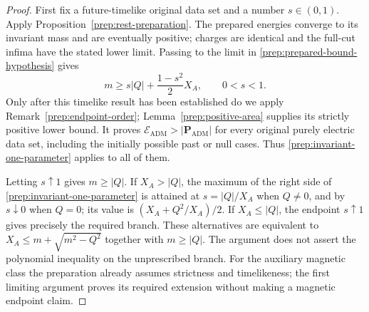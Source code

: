 \begin{proof}
First fix a future-timelike original data set and a number $s\in(0,1)$.
Apply Proposition~\ref{prep:rest-preparation}.  The prepared energies
converge to its invariant mass and are eventually positive; charges
are identical and the full-cut infima have the stated lower limit.
Passing to the limit in \eqref{prep:prepared-bound-hypothesis} gives
\begin{equation}
 \label{prep:invariant-one-parameter}
 m\geq s|Q|+\frac{1-s^2}{2}X_A,
 \qquad 0<s<1.
\end{equation}
Only after this timelike result has been established do we apply
Remark~\ref{prep:endpoint-order}; Lemma~\ref{prep:positive-area} supplies
its strictly positive lower bound.  It proves
$\mathcal E_{\mathrm{ADM}}>|\mathbf P_{\mathrm{ADM}}|$ for every
original purely electric data set, including the initially possible
past or null cases.  Thus \eqref{prep:invariant-one-parameter} applies
to all of them.

Letting $s\uparrow1$ gives $m\geq|Q|$.  If $X_A>|Q|$, the maximum of
the right side of \eqref{prep:invariant-one-parameter} is attained at
$s=|Q|/X_A$ when $Q\ne0$, and by $s\downarrow0$ when $Q=0$; its value
is $(X_A+Q^2/X_A)/2$.  If $X_A\leq|Q|$, the endpoint $s\uparrow1$
gives precisely the required branch.  These alternatives are
equivalent to
$X_A\leq m+\sqrt{m^2-Q^2}$ together with $m\geq|Q|$.
The argument does not assert the polynomial inequality on the
unprescribed branch.  For the auxiliary magnetic class the preparation
already assumes strictness and timelikeness; the first limiting
argument proves its required extension without making a magnetic
endpoint claim.
\end{proof}
